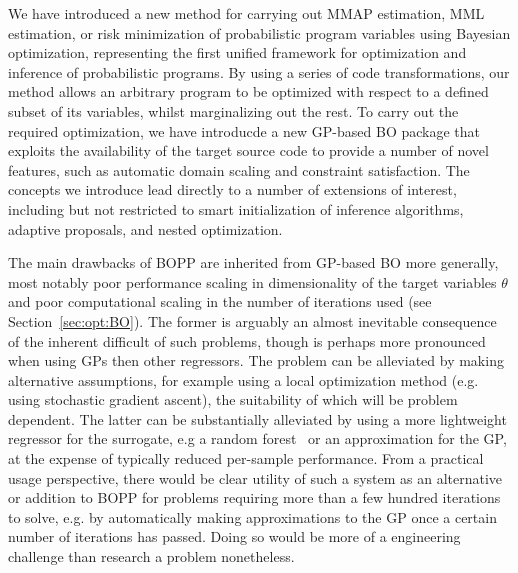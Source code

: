 
We have introduced a new method for carrying out MMAP estimation, MML estimation, or risk minimization
of probabilistic program variables using Bayesian optimization, representing the first unified framework for 
optimization and inference of probabilistic programs.  By using a series of code transformations, 
our method allows an arbitrary program to be optimized with respect to a defined subset of its variables, 
whilst marginalizing out the rest.  To carry out the required optimization, we have introducde a new GP-based 
BO package that exploits the availability of the target source code to provide a number of novel features, 
such as automatic domain scaling and constraint satisfaction.  
The concepts we introduce lead directly to a number of extensions of interest, including but not restricted 
to smart initialization of inference algorithms, adaptive proposals, and nested optimization.

The main drawbacks of BOPP are inherited from GP-based BO more generally,
most notably poor performance scaling in dimensionality of the target variables $\theta$ and poor 
computational scaling in the number of iterations used (see Section~\ref{sec:opt:BO}).  The former is 
arguably an almost inevitable consequence of the inherent difficult of such problems, though is perhaps
more pronounced when using GPs then other regressors.  The problem can be alleviated by making alternative
assumptions, for example using a local optimization method (e.g. using stochastic gradient ascent), the
suitability of which will be problem dependent.  The latter can be substantially alleviated by using 
a more lightweight regressor for the surrogate, e.g a random forest~\citep{hutter2011sequential} or
an approximation for the GP, at the expense of typically reduced per-sample performance.  From
a practical usage perspective, there would be clear utility of such a system as an alternative or
addition to BOPP for problems requiring more than a few hundred iterations to solve, e.g. by automatically
making approximations to the GP once a certain number of iterations has passed.  Doing so would be
more of a engineering challenge than research a problem nonetheless.

